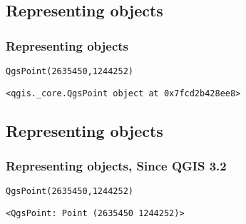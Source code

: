 \subsection{Representing objects}
\begin{frame}[fragile]
\frametitle{Representing objects}

\begin{lstlisting}[style=pythoncode]
QgsPoint(2635450,1244252)
\end{lstlisting}
\pause
\begin{lstlisting}[style=pythonoutput]
<qgis._core.QgsPoint object at 0x7fcd2b428ee8>
\end{lstlisting}

\end{frame}

\subsection{Representing objects}
\begin{frame}[fragile]
\frametitle{Representing objects, Since QGIS 3.2}

\begin{lstlisting}[style=pythoncode]
QgsPoint(2635450,1244252)
\end{lstlisting}
\pause
\begin{lstlisting}[style=pythonoutput]
<QgsPoint: Point (2635450 1244252)>
\end{lstlisting}

\end{frame}
